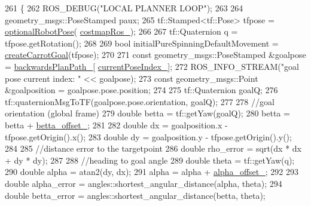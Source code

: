 \begin{DoxyCode}
261 \{
262     ROS\_DEBUG(\textcolor{stringliteral}{"LOCAL PLANNER LOOP"});
263 
264     geometry\_msgs::PoseStamped paux;
265     tf::Stamped<tf::Pose> tfpose = \hyperlink{namespacemove__base__z__client_1_1backward__local__planner_a80dbd10807e5f70adfcd0ff4dcb7c1db}{optionalRobotPose}(
      \hyperlink{classmove__base__z__client_1_1backward__local__planner_1_1BackwardLocalPlanner_a865618f84238fe6ff437d1e38ec5fec0}{costmapRos\_});
266 
267     tf::Quaternion q = tfpose.getRotation();
268 
269     \textcolor{keywordtype}{bool} initialPureSpinningDefaultMovement = \hyperlink{classmove__base__z__client_1_1backward__local__planner_1_1BackwardLocalPlanner_a0a48c91cb8043aa15d01eec4931e8552}{createCarrotGoal}(tfpose);
270 
271     \textcolor{keyword}{const} geometry\_msgs::PoseStamped &goalpose = \hyperlink{classmove__base__z__client_1_1backward__local__planner_1_1BackwardLocalPlanner_a451add2af7d6d83a7415277311b3ed04}{backwardsPlanPath\_}[
      \hyperlink{classmove__base__z__client_1_1backward__local__planner_1_1BackwardLocalPlanner_af304b2e7cde744ad905a1ae7889102b6}{currentPoseIndex\_}];
272     ROS\_INFO\_STREAM(\textcolor{stringliteral}{"goal pose current index: "} << goalpose);
273     \textcolor{keyword}{const} geometry\_msgs::Point &goalposition = goalpose.pose.position;
274 
275     tf::Quaternion goalQ;
276     tf::quaternionMsgToTF(goalpose.pose.orientation, goalQ);
277 
278     \textcolor{comment}{//goal orientation (global frame)}
279     \textcolor{keywordtype}{double} betta = tf::getYaw(goalQ);
280     betta = betta + \hyperlink{classmove__base__z__client_1_1backward__local__planner_1_1BackwardLocalPlanner_ae35f99afc3c859a4b14d0417ef7839df}{betta\_offset\_};
281 
282     \textcolor{keywordtype}{double} dx = goalposition.x - tfpose.getOrigin().x();
283     \textcolor{keywordtype}{double} dy = goalposition.y - tfpose.getOrigin().y();
284 
285     \textcolor{comment}{//distance error to the targetpoint}
286     \textcolor{keywordtype}{double} rho\_error = sqrt(dx * dx + dy * dy);
287 
288     \textcolor{comment}{//heading to goal angle}
289     \textcolor{keywordtype}{double} theta = tf::getYaw(q);
290     \textcolor{keywordtype}{double} alpha = atan2(dy, dx);
291     alpha = alpha + \hyperlink{classmove__base__z__client_1_1backward__local__planner_1_1BackwardLocalPlanner_ad406c50cdc7a7603c023718543fc2f5c}{alpha\_offset\_};
292 
293     \textcolor{keywordtype}{double} alpha\_error = angles::shortest\_angular\_distance(alpha, theta);
294     \textcolor{keywordtype}{double} betta\_error = angles::shortest\_angular\_distance(betta, theta);

\end{DoxyCode}
